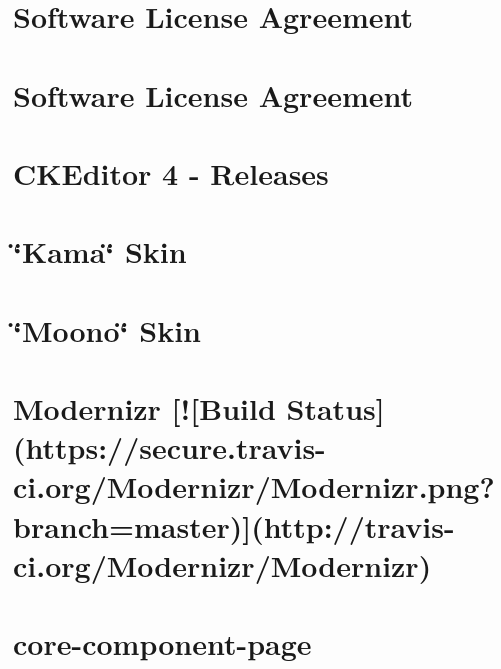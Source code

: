 \documentclass[twoside]{book}
\newcommand{\+}{\discretionary{\mbox{\scriptsize$\hookleftarrow$}}{}{}}
\begin{document}
\chapter{Software License Agreement}
\label{md_app_web_bower_components_ckeditor_plugins_scayt__l_i_c_e_n_s_e}

\chapter{Software License Agreement}
\label{md_app_web_bower_components_ckeditor_plugins_wsc__l_i_c_e_n_s_e}

\chapter{C\+K\+Editor 4 -\/ Releases}
\label{md_app_web_bower_components_ckeditor__r_e_a_d_m_e}

\chapter{\char`\"{}\+Kama\char`\"{} Skin}
\label{md_app_web_bower_components_ckeditor_skins_kama_readme}

\chapter{\char`\"{}\+Moono\char`\"{} Skin}
\label{md_app_web_bower_components_ckeditor_skins_moono_readme}

\chapter{Modernizr \mbox{[}!\mbox{[}Build Status\mbox{]}(https\+://secure.travis-\/ci.org/\+Modernizr/\+Modernizr.png?branch=master)\mbox{]}(http\+://travis-\/ci.org/\+Modernizr/\+Modernizr)}
\label{md_app_web_bower_components_components-modernizr__r_e_a_d_m_e}

\chapter{core-\/component-\/page}
\label{md_app_web_bower_components_core-component-page__r_e_a_d_m_e}

\end{document}
